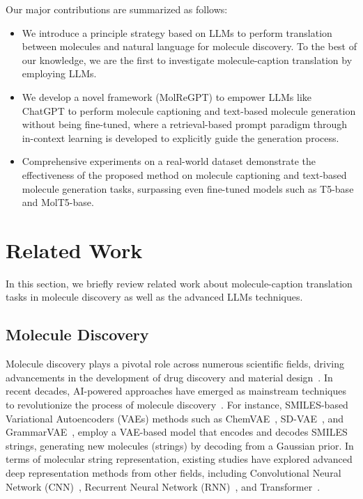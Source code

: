 \documentclass{article}
\theoremstyle{plain}
\theoremstyle{definition}
\theoremstyle{remark}
\begin{document}
Our major contributions are summarized as follows:
\begin{itemize}
    \item We introduce a principle strategy based on LLMs to perform translation between molecules and natural language for molecule discovery. To the best of our knowledge, we are the first to investigate molecule-caption translation by employing LLMs.

    \item We develop a novel framework (MolReGPT) to empower LLMs like ChatGPT to perform molecule captioning and text-based molecule generation without being fine-tuned, where a retrieval-based prompt paradigm through in-context learning is developed to explicitly guide the generation process.
    
    \item Comprehensive experiments on a real-world dataset demonstrate the effectiveness of the proposed method on molecule captioning and text-based molecule generation tasks, surpassing even fine-tuned models such as T5-base and MolT5-base.
\end{itemize} 
 \section{Related Work}
\label{sec:relatedwork}
In this section, we briefly review related work about molecule-caption translation tasks in molecule discovery as well as the advanced LLMs techniques. 
 
\subsection{Molecule Discovery}


Molecule discovery plays a pivotal role across numerous scientific fields, driving advancements in the development of drug discovery and material design~\cite{du2022molgensurvey}.
In recent decades, AI-powered approaches have emerged as mainstream techniques to revolutionize the process of molecule discovery~\cite{hu2023deep,fan2023generative}.
For instance, SMILES-based Variational Autoencoders (VAEs) methods such as ChemVAE~\cite{gomez2018automatic}, SD-VAE~\cite{dai2018syntax}, and GrammarVAE~\cite{kusner2017grammar}, employ a VAE-based model that encodes and decodes SMILES strings, generating new molecules (strings) by decoding from a Gaussian prior.
In terms of molecular string representation, existing studies have explored advanced deep representation methods from other fields, including Convolutional Neural Network (CNN)~\cite{peng2019convolutional,le2019imotor}, Recurrent Neural Network (RNN)~\cite{grisoni2020bidirectional,amabilino2020guidelines}, and Transformer~\cite{bagal2021molgpt,wang2021multi}.
\end{document}
